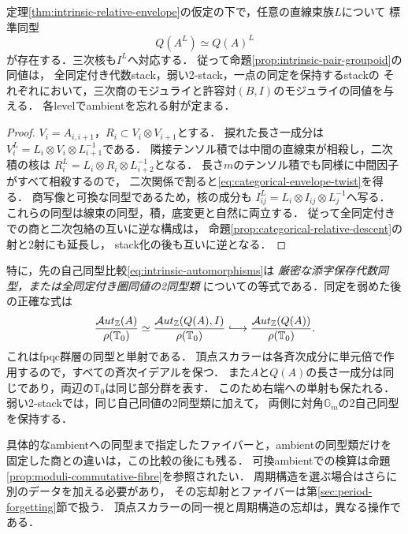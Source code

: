 \begin{proposition}[内在的復元のgauge同変性]
\label{prop:categorical-envelope-equivariance}
定理\ref{thm:intrinsic-relative-envelope}の仮定の下で，任意の直線束族$L$について
標準同型
\begin{equation}\label{eq:categorical-envelope-twist}
 Q(A^L)\simeq Q(A)^L
\end{equation}
が存在する．三次核も$I^L$へ対応する．
従って命題\ref{prop:intrinsic-pair-groupoid}の同値は，
全同定付き代数stack，弱い2-stack，一点の同定を保持するstackの
それぞれにおいて，三次商のモジュライと許容対$(B,I)$のモジュライの同値を与える．
各levelでambientを忘れる射が定まる．
\end{proposition}
\begin{proof}
$V_i=A_{i,i+1}$，$R_i\subset V_i\otimes V_{i+1}$とする．
捩れた長さ一成分は$V_i^L=L_i\otimes V_i\otimes L_{i+1}^{-1}$である．
隣接テンソル積では中間の直線束が相殺し，二次積の核は
$R_i^L=L_i\otimes R_i\otimes L_{i+2}^{-1}$となる．
長さ$m$のテンソル積でも同様に中間因子がすべて相殺するので，
二次関係で割ると\eqref{eq:categorical-envelope-twist}を得る．
商写像と可換な同型であるため，核の成分も
$I^L_{ij}=L_i\otimes I_{ij}\otimes L_j^{-1}$へ写る．
これらの同型は線束の同型，積，底変更と自然に両立する．
従って全同定付きでの商と二次包絡の互いに逆な構成は，
命題\ref{prop:categorical-relative-descent}の射と2射にも延長し，
stack化の後も互いに逆となる．
\end{proof}

特に，先の自己同型比較\eqref{eq:intrinsic-automorphisms}は
\emph{厳密な添字保存代数同型，または全同定付き圏同値の2同型類}
についての等式である．同定を弱めた後の正確な式は
\begin{equation}\label{eq:categorical-pointed-pair-aut}
 \frac{\mathcal Aut_{\mathbb Z}(A)}{\rho(\mathbb T_0)}
 \simeq
 \frac{\mathcal Aut_{\mathbb Z}(Q(A),I)}{\rho(\mathbb T_0)}
 \lhook\joinrel\longrightarrow
 \frac{\mathcal Aut_{\mathbb Z}(Q(A))}{\rho(\mathbb T_0)}.
\end{equation}
これはfpqc群層の同型と単射である．
頂点スカラーは各斉次成分に単元倍で作用するので，すべての斉次イデアルを保つ．
また$A$と$Q(A)$の長さ一成分は同じであり，両辺の$\mathbb T_0$は同じ部分群を表す．
このため右端への単射も保たれる．
弱い2-stackでは，同じ自己同値の2同型類に加えて，
両側に対角$\mathbb G_m$の2自己同型を保持する．

具体的なambientへの同型まで指定したファイバーと，ambientの同型類だけを
固定した商との違いは，この比較の後にも残る．
可換ambientでの検算は命題\ref{prop:moduli-commutative-fibre}を参照されたい．
周期構造を選ぶ場合はさらに別のデータを加える必要があり，
その忘却射とファイバーは第\ref{sec:period-forgetting}節で扱う．
頂点スカラーの同一視と周期構造の忘却は，異なる操作である．

